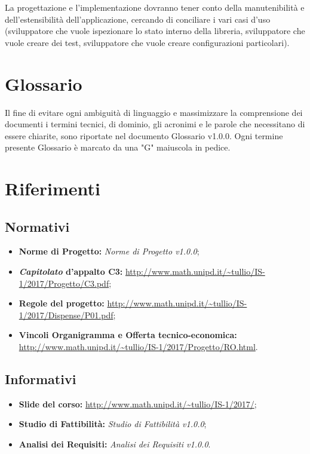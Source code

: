 \documentclass[./PianodiProgetto.tex]{subfiles}
\begin{document}
	La progettazione e l'implementazione dovranno tener conto della manutenibilità e dell'estensibilità dell'applicazione, cercando di conciliare i vari casi d'uso (sviluppatore che vuole ispezionare lo stato interno della libreria, sviluppatore che vuole creare dei test, sviluppatore che vuole creare configurazioni particolari). 
	
	\section{Glossario}
	Il fine di evitare ogni ambiguità di linguaggio e massimizzare la comprensione dei documenti i termini tecnici, di dominio, gli acronimi e le parole che necessitano di essere chiarite, sono riportate nel documento Glossario v1.0.0. Ogni termine presente Glossario è marcato da una "G" maiuscola in pedice.
	
	\section{Riferimenti}
	
	\subsection{Normativi}
	\begin{itemize}
		\item \textbf{Norme di Progetto:} \textit{Norme di Progetto v1.0.0};
		\item \textbf{\textit{Capitolato} d'appalto C3:} \url{http://www.math.unipd.it/~tullio/IS-1/2017/Progetto/C3.pdf};
		\item \textbf{Regole del progetto:} \url{http://www.math.unipd.it/~tullio/IS-1/2017/Dispense/P01.pdf};
		\item \textbf{Vincoli Organigramma e Offerta tecnico-economica:} \url{http://www.math.unipd.it/~tullio/IS-1/2017/Progetto/RO.html}.
	\end{itemize}
	
	\subsection{Informativi}
	\begin{itemize}
		\item \textbf{Slide del corso:} \url{http://www.math.unipd.it/~tullio/IS-1/2017/};
		\item \textbf{Studio di Fattibilità:} \textit{Studio di Fattibilità v1.0.0};
		\item \textbf{Analisi dei Requisiti:} \textit{Analisi dei Requisiti v1.0.0}.
	\end{itemize}
	
\end{document}
